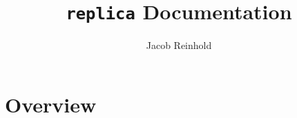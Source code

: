 \documentclass[12pt]{article}
\title{\texttt{replica} Documentation}
\author{Jacob Reinhold}
\begin{document}
\maketitle
\tableofcontents

\section{Overview}
\end{document}
